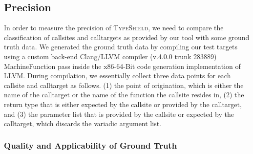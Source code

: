 \subsection{Precision}
\label{section:typeshieldprecision}

In order to measure the precision of \textsc{TypeShield}, we need to compare the classification of callsites and calltargets as provided by our tool with 
some ground truth data. We generated the ground truth data by compiling our test targets using a 
custom back-end Clang/LLVM compiler (v.4.0.0 trunk 283889) MachineFunction pass inside the x86-64-Bit code generation implementation of LLVM. 
During compilation, we essentially collect three data points for each callsite and calltarget as follows.
(1) the point of origination, which is either the name of the calltarget or the name of the function the callsite resides in, 
(2) the return type that is either expected by the callsite or provided by the calltarget, and 
(3) the parameter list that is provided by the callsite or expected by the calltarget, which discards the variadic argument list.

\subsubsection{Quality and Applicability of Ground Truth}
\label{subsection:typeshieldprecision}

\texttt{}

